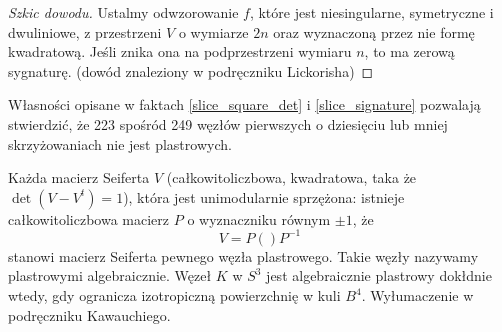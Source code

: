 \begin{proof}[Szkic dowodu]
    Ustalmy odwzorowanie $f$, które jest niesingularne, symetryczne i dwuliniowe, z przestrzeni $V$ o wymiarze $2n$ oraz wyznaczoną przez nie formę kwadratową.
    Jeśli znika ona na podprzestrzeni wymiaru $n$, to ma zerową sygnaturę.
    (dowód znaleziony w podręczniku Lickorisha)
\end{proof}

Własności opisane w faktach \ref{slice_square_det} i \ref{slice_signature} pozwalają stwierdzić, że 223 spośród 249 węzłów pierwszych o dziesięciu lub mniej skrzyżowaniach nie jest plastrowych.

Każda macierz Seiferta $V$ (całkowitoliczbowa, kwadratowa, taka że $\det (V - V^t) = 1$), która jest unimodularnie sprzężona: istnieje całkowitoliczbowa macierz $P$ o wyznaczniku równym $\pm 1$, że
\[
    V = P () P^{-1}
\]
stanowi macierz Seiferta pewnego węzła plastrowego.
Takie węzły nazywamy plastrowymi algebraicznie.
Węzeł $K$ w $S^3$ jest algebraicznie plastrowy dokłdnie wtedy, gdy ogranicza izotropiczną powierzchnię w kuli $B^4$.
Wyłumaczenie w podręczniku Kawauchiego.


